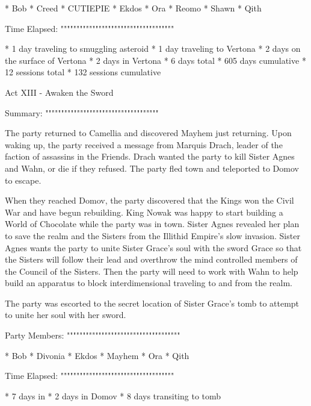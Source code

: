   * Bob
  * Creed
  * CUTIEPIE
  * Ekdos
  * Ora
  * Reomo
  * Shawn
  * Qith

Time Elapsed:
""""""""""""""""""""""""""""""""""""

  * 1 day traveling to smuggling asteroid
  * 1 day traveling to Vertona
  * 2 days on the surface of Vertona
  * 2 days in Vertona
  * 6 days total
  * 605 days cumulative
  * 12 sessions total
  * 132 sessions cumulative

Act XIII - Awaken the Sword
^^^^^^^^^^^^^^^^^^^^^^^^^^^^^^^^^^^^

Summary:
""""""""""""""""""""""""""""""""""""

The party returned to Camellia and discovered Mayhem just returning.
Upon waking up, the party received a message from Marquis Drach, leader of the faction of assassins in the Friends.
Drach wanted the party to kill Sister Agnes and Wahn, or die if they refused.
The party fled town and teleported to Domov to escape.

When they reached Domov, the party discovered that the Kings won the Civil War and have begun rebuilding.
King Nowak was happy to start building a World of Chocolate while the party was in town.
Sister Agnes revealed her plan to save the realm and the Sisters from the Illithid Empire's slow invasion.
Sister Agnes wants the party to unite Sister Grace's soul with the sword Grace so that the Sisters will follow their lead and overthrow the mind controlled members of the Council of the Sisters.
Then the party will need to work with Wahn to help build an apparatus to block interdimensional traveling to and from the realm.

The party was escorted to the secret location of Sister Grace's tomb to attempt to unite her soul with her sword.

Party Members:
""""""""""""""""""""""""""""""""""""

  * Bob
  * Divonia
  * Ekdos
  * Mayhem
  * Ora
  * Qith

Time Elapsed:
""""""""""""""""""""""""""""""""""""

  * 7 days in 
  * 2 days in Domov
  * 8 days transiting to tomb

